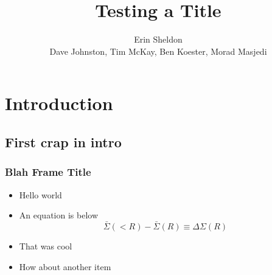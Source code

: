 \documentclass{beamer}
\title{Testing a Title}
\author
{
    Erin Sheldon \\
    {\tiny Dave Johnston, Tim McKay, Ben Koester, Morad Masjedi}
}
\begin{document}
\frame{\titlepage}

\section{Introduction}

\subsection{First crap in intro}

\frame
{
    \frametitle{Blah Frame Title}

    \begin{itemize}
        \item Hello world
        \item An equation is below
        \begin{equation}
            \bar{\Sigma}(<R) - \bar{\Sigma}(R) \equiv \Delta \Sigma(R)
            \nonumber
        \end{equation}
        \item That was cool
        \item How about another item
    \end{itemize}
}
\end{document}
